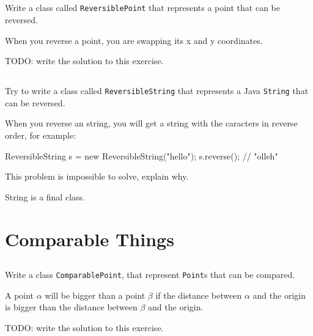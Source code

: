 \documentclass[a4paper, 11pt]{article}
\begin{document}
\subsection{}

Write a class called \texttt{ReversiblePoint} that represents a point that can
be reversed.

When you reverse a point, you are swapping its x and y coordinates.

\begin{solution}
TODO: write the solution to this exercise.
\end{solution}

\subsection{}

Try to write a class called \texttt{ReversibleString} that represents a Java
\texttt{String} that can be reversed.

When you reverse an string, you will get a string with the caracters in reverse
order, for example:

\begin{blackboard}
ReversibleString s = new ReversibleString("hello");
s.reverse(); // "olleh"
\end{blackboard}

This problem is impossible to solve, explain why.

\begin{solution}
String is a final class.
\end{solution}


\section{Comparable Things}

\subsection{}

Write a class \texttt{ComparablePoint}, that represent \texttt{Point}s that can
be compared.

A point $\alpha$ will be bigger than a point $\beta$ if the distance between
$\alpha$ and the origin is bigger than the distance between $\beta$ and the
origin.

\begin{solution}
TODO: write the solution to this exercise.
\end{solution}
\end{document}
